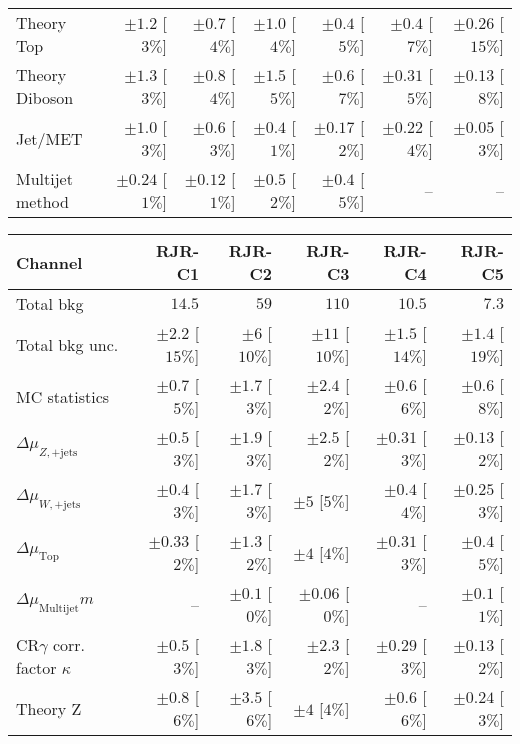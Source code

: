 \begin{table}[tbp]
\begin{center}
\begin{tabular}{|lrrrrrr|}
Theory Top   &  $\pm 1.2$ [$3\%$]  &  $\pm 0.7$ [$4\%$]  &  $\pm 1.0$ [$4\%$]  &  $\pm 0.4$ [$5\%$]  &  $\pm 0.4$ [$7\%$]  &  $\pm 0.26$ [$15\%$] \\
Theory Diboson  &  $\pm 1.3$ [$3\%$]  &  $\pm 0.8$ [$4\%$]  &  $\pm 1.5$ [$5\%$]  &  $\pm 0.6$ [$7\%$]  &  $\pm 0.31$ [$5\%$]  &  $\pm 0.13$ [$8\%$] \\
Jet/MET   &  $\pm 1.0$ [$3\%$]  &  $\pm 0.6$ [$3\%$]  &  $\pm 0.4$ [$1\%$]  &  $\pm 0.17$ [$2\%$]  &  $\pm 0.22$ [$4\%$]  &  $\pm 0.05$ [$3\%$] \\
Multijet method  &  $\pm 0.24$ [$1\%$]  &  $\pm 0.12$ [$1\%$]  &  $\pm 0.5$ [$2\%$]  &  $\pm 0.4$ [$5\%$]  &   --    &   --   \\
\hline
\end{tabular}

\begin{tabular}{|lrrrrr|}
\hline
Channel                           & \textbf{ RJR-C1 }   & \textbf{ RJR-C2 }  & \textbf{ RJR-C3 }  & \textbf{ RJR-C4 }   & \textbf{ RJR-C5 }   \\ \hline
Total bkg                         & $14.5$              & $59$               & $110$              & $10.5$              & $7.3$               \\
Total bkg unc.                    & $\pm 2.2$  [$15\%$] & $\pm 6$  [$10\%$]  & $\pm 11$  [$10\%$] & $\pm 1.5$  [$14\%$] & $\pm 1.4$  [$19\%$] \\
\hline
MC statistics                     & $\pm 0.7$ [$5\%$]   & $\pm 1.7$ [$3\%$]  & $\pm 2.4$ [$2\%$]  & $\pm 0.6$ [$6\%$]   & $\pm 0.6$ [$8\%$]   \\
$\Delta\mu_{Z,\mathrm{+jets}}$    & $\pm 0.5$ [$3\%$]   & $\pm 1.9$ [$3\%$]  & $\pm 2.5$ [$2\%$]  & $\pm 0.31$ [$3\%$]  & $\pm 0.13$ [$2\%$]  \\
$\Delta\mu_{W,\mathrm{+jets}}$    & $\pm 0.4$ [$3\%$]   & $\pm 1.7$ [$3\%$]  & $\pm 5$ [$5\%$]    & $\pm 0.4$ [$4\%$]   & $\pm 0.25$ [$3\%$]  \\
$\Delta\mu_{\mathrm{ Top}}$       & $\pm 0.33$ [$2\%$]  & $\pm 1.3$ [$2\%$]  & $\pm 4$ [$4\%$]    & $\pm 0.31$ [$3\%$]  & $\pm 0.4$ [$5\%$]   \\
$\Delta\mu_{\mathrm{ Multijet}}m$ & --                  & $\pm 0.1$ [$0\%$]  & $\pm 0.06$ [$0\%$] & --                  & $\pm 0.1$ [$1\%$]   \\
CR$\gamma$ corr. factor $\kappa$  & $\pm 0.5$ [$3\%$]   & $\pm 1.8$ [$3\%$]  & $\pm 2.3$ [$2\%$]  & $\pm 0.29$ [$3\%$]  & $\pm 0.13$ [$2\%$]  \\
Theory Z                          & $\pm 0.8$ [$6\%$]   & $\pm 3.5$ [$6\%$]  & $\pm 4$ [$4\%$]    & $\pm 0.6$ [$6\%$]   & $\pm 0.24$ [$3\%$]  \\

\end{tabular}
\end{center}
\end{table}
